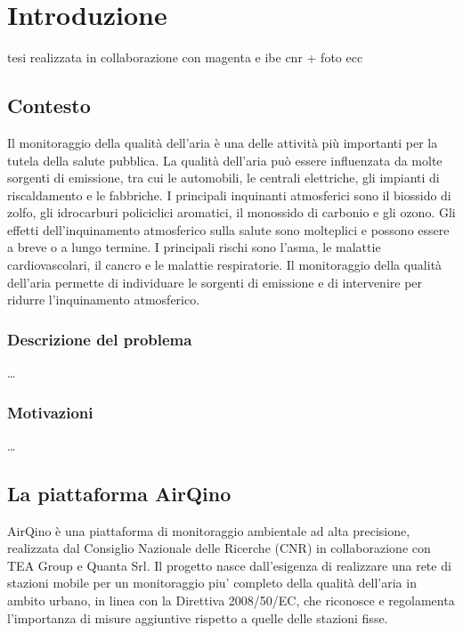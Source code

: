 \chapter{Introduzione}\label{ch:introduzione}
tesi realizzata in collaborazione con magenta e ibe cnr + foto ecc

\section{Contesto}\label{sec:contesto}


Il monitoraggio della qualità dell'aria è una delle attività più importanti per la tutela della salute pubblica. La qualità dell'aria può essere influenzata da molte sorgenti di emissione, tra cui le automobili, le centrali elettriche, gli impianti di riscaldamento e le fabbriche. I principali inquinanti atmosferici sono il biossido di zolfo, gli idrocarburi policiclici aromatici, il monossido di carbonio e gli ozono. Gli effetti dell'inquinamento atmosferico sulla salute sono molteplici e possono essere a breve o a lungo termine. I principali rischi sono l'asma, le malattie cardiovascolari, il cancro e le malattie respiratorie. Il monitoraggio della qualità dell'aria permette di individuare le sorgenti di emissione e di intervenire per ridurre l'inquinamento atmosferico.

\subsection{Descrizione del problema}\label{ssec:problema}
\ldots

\subsection{Motivazioni}\label{ssec:motivazoni}
\ldots

\section{La piattaforma AirQino}\label{sec:airqino}
AirQino è una piattaforma di monitoraggio ambientale ad alta precisione, realizzata dal Consiglio Nazionale delle Ricerche (CNR) in collaborazione con TEA Group e Quanta Srl.
Il progetto nasce dall’esigenza di realizzare una rete di stazioni mobile per un monitoraggio piu’ completo della qualità dell’aria in ambito urbano, in linea con la Direttiva 2008/50/EC, che riconosce e regolamenta l’importanza di misure aggiuntive rispetto a quelle delle stazioni fisse.


